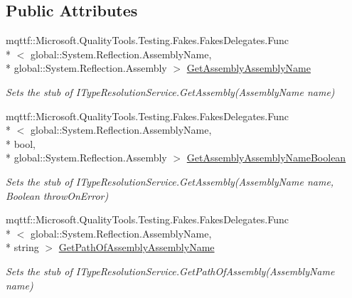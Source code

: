 \subsection*{Public Attributes}
\begin{DoxyCompactItemize}
\item 
mqttf\-::\-Microsoft.\-Quality\-Tools.\-Testing.\-Fakes.\-Fakes\-Delegates.\-Func\\*
$<$ global\-::\-System.\-Reflection.\-Assembly\-Name, \\*
global\-::\-System.\-Reflection.\-Assembly $>$ \hyperlink{class_system_1_1_component_model_1_1_design_1_1_fakes_1_1_stub_i_type_resolution_service_af9f13884b7ffda6eea45ee12b26d40ce}{Get\-Assembly\-Assembly\-Name}
\begin{DoxyCompactList}\small\item\em Sets the stub of I\-Type\-Resolution\-Service.\-Get\-Assembly(\-Assembly\-Name name)\end{DoxyCompactList}\item 
mqttf\-::\-Microsoft.\-Quality\-Tools.\-Testing.\-Fakes.\-Fakes\-Delegates.\-Func\\*
$<$ global\-::\-System.\-Reflection.\-Assembly\-Name, \\*
bool, \\*
global\-::\-System.\-Reflection.\-Assembly $>$ \hyperlink{class_system_1_1_component_model_1_1_design_1_1_fakes_1_1_stub_i_type_resolution_service_ab5c3d30a68e45b39324047c217536da9}{Get\-Assembly\-Assembly\-Name\-Boolean}
\begin{DoxyCompactList}\small\item\em Sets the stub of I\-Type\-Resolution\-Service.\-Get\-Assembly(\-Assembly\-Name name, Boolean throw\-On\-Error)\end{DoxyCompactList}\item 
mqttf\-::\-Microsoft.\-Quality\-Tools.\-Testing.\-Fakes.\-Fakes\-Delegates.\-Func\\*
$<$ global\-::\-System.\-Reflection.\-Assembly\-Name, \\*
string $>$ \hyperlink{class_system_1_1_component_model_1_1_design_1_1_fakes_1_1_stub_i_type_resolution_service_aa05be80128d41bee988c15c004b6f15f}{Get\-Path\-Of\-Assembly\-Assembly\-Name}
\begin{DoxyCompactList}\small\item\em Sets the stub of I\-Type\-Resolution\-Service.\-Get\-Path\-Of\-Assembly(\-Assembly\-Name name)\end{DoxyCompactList}\item 

\end{DoxyCompactItemize}

